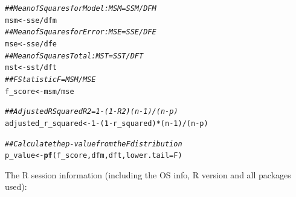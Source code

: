 \documentclass{article}\usepackage[]{graphicx}\usepackage[]{xcolor}
\makeatletter
\newcommand{\hlnum}[1]{\textcolor[rgb]{0.686,0.059,0.569}{#1}}%
\newcommand{\hlcom}[1]{\textcolor[rgb]{0.678,0.584,0.686}{\textit{#1}}}%
\newcommand{\hlopt}[1]{\textcolor[rgb]{0,0,0}{#1}}%
\newcommand{\hlstd}[1]{\textcolor[rgb]{0.345,0.345,0.345}{#1}}%
\newcommand{\hlkwb}[1]{\textcolor[rgb]{0.69,0.353,0.396}{#1}}%
\newcommand{\hlkwc}[1]{\textcolor[rgb]{0.333,0.667,0.333}{#1}}%
\newcommand{\hlkwd}[1]{\textcolor[rgb]{0.737,0.353,0.396}{\textbf{#1}}}%
\newenvironment{kframe}{%
 \def\at@end@of@kframe{}%
 \ifinner\ifhmode%
  \def\at@end@of@kframe{\end{minipage}}%
  \begin{minipage}{\columnwidth}%
 \fi\fi%
 \def\FrameCommand##1{\hskip\@totalleftmargin \hskip-\fboxsep
 \colorbox{shadecolor}{##1}\hskip-\fboxsep
     \hskip-\linewidth \hskip-\@totalleftmargin \hskip\columnwidth}%
 \MakeFramed {\advance\hsize-\width
   \@totalleftmargin\z@ \linewidth\hsize
   \@setminipage}}%
 {\par\unskip\endMakeFramed%
 \at@end@of@kframe}
\newenvironment{knitrout}{}{} %
\makeatother
\begin{document}
\begin{knitrout}
\begin{kframe}
\begin{alltt}
\hlcom{## Mean of Squares for Model:   MSM = SSM / DFM}
\hlstd{msm} \hlkwb{<-} \hlstd{sse}\hlopt{/}\hlstd{dfm}
\hlcom{## Mean of Squares for Error:   MSE = SSE / DFE}
\hlstd{mse} \hlkwb{<-} \hlstd{sse}\hlopt{/}\hlstd{dfe}
\hlcom{## Mean of Squares Total:   MST = SST / DFT}
\hlstd{mst} \hlkwb{<-} \hlstd{sst}\hlopt{/}\hlstd{dft}
\hlcom{## F Statistic F = MSM/MSE}
\hlstd{f_score} \hlkwb{<-} \hlstd{msm}\hlopt{/}\hlstd{mse}

\hlcom{## Adjusted R Squared R2 = 1 - (1 - R2)(n - 1) / (n - p)}
\hlstd{adjusted_r_squared} \hlkwb{<-} \hlnum{1} \hlopt{-} \hlstd{(}\hlnum{1} \hlopt{-} \hlstd{r_squared)}\hlopt{*}\hlstd{(n} \hlopt{-} \hlnum{1}\hlstd{)} \hlopt{/} \hlstd{(n} \hlopt{-} \hlstd{p)}

\hlcom{## Calculate the p-value from the F distribution}
\hlstd{p_value} \hlkwb{<-} \hlkwd{pf}\hlstd{(f_score, dfm, dft,} \hlkwc{lower.tail}\hlstd{=F)}
\end{alltt}
\end{kframe}
\end{knitrout}

The R session information (including the OS info, R version and all
packages used):
\end{document}
